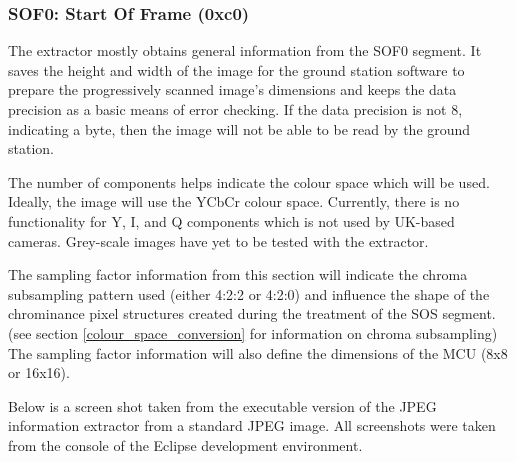 \subsubsection{SOF0: Start Of Frame (0xc0)}

The extractor mostly obtains general information from the SOF0 segment. 
It saves the height and width of the image for the ground station
software to prepare the progressively scanned image's dimensions
and keeps the data precision as a basic means of error checking. 
If the data precision is not 8, indicating a byte, then the image will not
be able to be read by the ground station.

The number of components helps indicate the colour space which will
be used. Ideally, the image will use the YCbCr colour space. Currently,
there is no functionality for Y, I, and Q components  which is not
used by UK-based cameras. Grey-scale images have yet to be
tested with the extractor.

The sampling factor information from this section will indicate
the chroma subsampling pattern used (either 4:2:2 or 4:2:0)
and influence the shape of the chrominance pixel structures
created during the treatment of the SOS segment. 
(see section \ref{colour_space_conversion} 
for information on chroma subsampling) The 
sampling factor information will also define the dimensions of the
MCU (8x8 or 16x16).

Below is a screen shot taken from the executable version of
the JPEG information extractor from a standard JPEG image.
All screenshots were taken from the console of the Eclipse
development environment.

